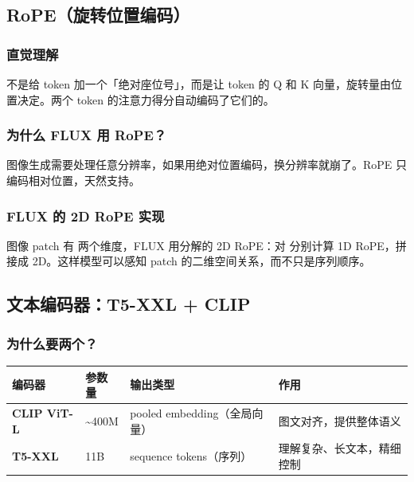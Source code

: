 \subsection{RoPE（旋转位置编码）}

\subsubsection{直觉理解}

\begin{intubox}
不是给 token 加一个「绝对座位号」，而是让 token 的 Q 和 K 向量，旋转量由位置决定。两个 token 的注意力得分自动编码了它们的。
\end{intubox}

\subsubsection{为什么 FLUX 用 RoPE？}

图像生成需要处理任意分辨率，如果用绝对位置编码，换分辨率就崩了。RoPE 只编码相对位置，天然支持。

\subsubsection{FLUX 的 2D RoPE 实现}

图像 patch 有  两个维度，FLUX 用分解的 2D RoPE：对  分别计算 1D RoPE，拼接成 2D。这样模型可以感知 patch 的二维空间关系，而不只是序列顺序。

\subsection{文本编码器：T5-XXL + CLIP}

\subsubsection{为什么要两个？}

\begin{summarybox}
\begin{center}
{\small
\begin{tabular}{p{2.5cm}p{1.8cm}p{3.5cm}p{4cm}}
\hline
\textbf{编码器} & \textbf{参数量} & \textbf{输出类型} & \textbf{作用} \\
\hline
\textbf{CLIP ViT-L} & \textasciitilde400M & pooled embedding（全局向量） & 图文对齐，提供整体语义 \\
\textbf{T5-XXL} & 11B & sequence tokens（序列） & 理解复杂、长文本，精细控制 \\
\hline
\end{tabular}
}
\end{center}
\end{summarybox}

